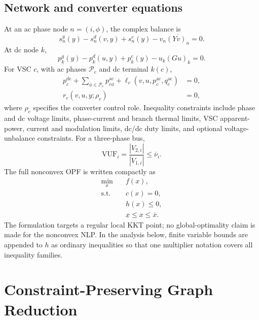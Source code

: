 \documentclass[journal,10pt]{IEEEtran}
\newcommand{\ac}{\mathrm{ac}}
\newcommand{\dc}{\mathrm{dc}}
\begin{document}
\subsection{Network and converter equations}
At an ac phase node $n=(i,\phi)$, the complex balance is
\begin{equation}
 s_n^{g}(y)-s_n^{d}(v,y)+s_n^{c}(y)
 -v_n\overline{(Yv)_n}=0.                         \label{eq:ac_balance}
\end{equation}
At dc node $k$,
\begin{equation}
 p_k^{g}(y)-p_k^{d}(u,y)+p_k^{c}(y)-u_k(Gu)_k=0. \label{eq:dc_balance}
\end{equation}
For VSC $c$, with ac phases $\mathcal{P}_c$ and dc terminal $k(c)$,
\begin{align}
 p_c^{\dc}+\sum_{\phi\in\mathcal{P}_c}p_{c\phi}^{\ac}
 +\ell_c(v,u,p_c^{\ac},q_c^{\ac})&=0,             \label{eq:vsc_energy}\\
 r_c(v,u,y;\rho_c)&=0,                              \label{eq:vsc_control}
\end{align}
where $\rho_c$ specifies the converter control role.  Inequality constraints
include phase and dc voltage limits, phase-current and branch thermal limits,
VSC apparent-power, current and modulation limits, dc/dc duty limits, and
optional voltage-unbalance constraints.  For a three-phase bus,
\begin{equation}
 \mathrm{VUF}_i=\frac{|V_{2,i}|}{|V_{1,i}|}\leq\overline{\nu}_i.
 \label{eq:vuf}
\end{equation}
The full nonconvex OPF is written compactly as
\begin{subequations}\label{eq:full_opf}
\begin{align}
  \min_x\quad & f(x),\\
  \mathrm{s.t.}\quad & c(x)=0,\\
  & h(x)\leq 0,\\
  & \underline{x}\leq x\leq\overline{x}.
\end{align}
\end{subequations}
The formulation targets a regular local KKT point; no global-optimality claim is
made for the nonconvex NLP.  In the analysis below, finite variable bounds are
appended to $h$ as ordinary inequalities so that one multiplier notation covers
all inequality families.

\section{Constraint-Preserving Graph Reduction}
\end{document}
